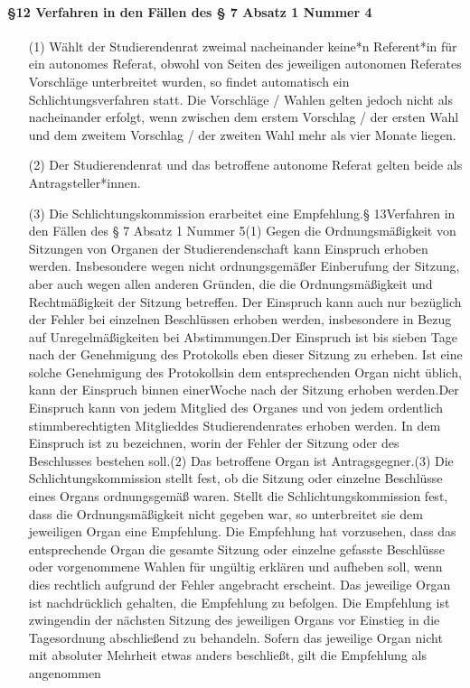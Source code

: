         \paragraph{§12 Verfahren in den Fällen des § 7 Absatz 1 Nummer 4}
            \begin{itemize}
                \item[(1)] Wählt der Studierendenrat zweimal nacheinander keine*n Referent*in für ein autonomes Referat, obwohl von Seiten des jeweiligen autonomen Referates Vorschläge unterbreitet wurden, so findet automatisch ein Schlichtungsverfahren statt. Die Vorschläge / Wahlen gelten jedoch nicht als nacheinander erfolgt, wenn zwischen dem erstem Vorschlag / der ersten Wahl und dem zweitem Vorschlag / der zweiten Wahl mehr als vier Monate liegen.
                \item[(2)]    Der Studierendenrat und das betroffene autonome Referat gelten beide als Antragsteller*innen.
                \item[(3)]    Die Schlichtungskommission erarbeitet eine Empfehlung.§ 13Verfahren in den Fällen des § 7 Absatz 1 Nummer 5(1)    Gegen die Ordnungsmäßigkeit von Sitzungen von Organen der Studierendenschaft kann Einspruch erhoben werden. Insbesondere wegen nicht ordnungsgemäßer Einberufung der Sitzung, aber auch wegen allen anderen Gründen, die die Ordnungsmäßigkeit und Rechtmäßigkeit der Sitzung betreffen. Der Einspruch kann auch nur bezüglich der Fehler bei einzelnen Beschlüssen erhoben werden, insbesondere in Bezug auf Unregelmäßigkeiten bei Abstimmungen.Der Einspruch ist bis sieben Tage nach der Genehmigung des Protokolls eben dieser Sitzung zu erheben. Ist eine solche Genehmigung des Protokollsin dem entsprechenden Organ nicht üblich, kann der Einspruch binnen einerWoche nach der Sitzung erhoben werden.Der Einspruch kann von jedem Mitglied des Organes und von jedem ordentlich stimmberechtigten Mitglieddes Studierendenrates erhoben werden. In dem Einspruch ist zu bezeichnen, worin der Fehler der Sitzung oder des Beschlusses bestehen soll.(2)    Das betroffene Organ ist Antragsgegner.(3)    Die Schlichtungskommission stellt fest, ob die Sitzung oder einzelne Beschlüsse eines Organs ordnungsgemäß waren. Stellt die Schlichtungskommission fest, dass die Ordnungsmäßigkeit nicht gegeben war, so unterbreitet sie dem jeweiligen Organ eine Empfehlung. Die Empfehlung hat vorzusehen, dass das entsprechende Organ die gesamte Sitzung oder einzelne gefasste Beschlüsse oder vorgenommene Wahlen für ungültig erklären und aufheben soll, wenn dies rechtlich aufgrund der Fehler angebracht erscheint. Das jeweilige Organ ist nachdrücklich gehalten, die Empfehlung zu befolgen. Die Empfehlung ist zwingendin der nächsten Sitzung des jeweiligen Organs vor Einstieg in die Tagesordnung abschließend zu behandeln. Sofern das jeweilige Organ nicht mit absoluter Mehrheit etwas anders beschließt, gilt die Empfehlung als angenommen

\end{itemize}

